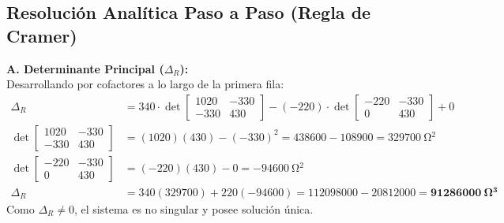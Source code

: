 \documentclass[11pt, a4paper]{article}
\begin{document}
\subsection{Resolución Analítica Paso a Paso (Regla de Cramer)}
\textbf{A. Determinante Principal ($\Delta_R$):} \\
Desarrollando por cofactores a lo largo de la primera fila:
\begin{align*}
    \Delta_R &= 340 \cdot \det \begin{bmatrix} 1020 & -330 \\ -330 & 430 \end{bmatrix} - (-220) \cdot \det \begin{bmatrix} -220 & -330 \\ 0 & 430 \end{bmatrix} + 0 \\
    \det \begin{bmatrix} 1020 & -330 \\ -330 & 430 \end{bmatrix} &= (1020)(430) - (-330)^2 = 438600 - 108900 = \qty{329700}{\ohm^2} \\
    \det \begin{bmatrix} -220 & -330 \\ 0 & 430 \end{bmatrix} &= (-220)(430) - 0 = \qty{-94600}{\ohm^2} \\
    \Delta_R &= 340(329700) + 220(-94600) = 112098000 - 20812000 = \mathbf{\qty{91286000}{\ohm^3}}
\end{align*}
Como $\Delta_R \neq 0$, el sistema es no singular y posee solución única.
\end{document}
